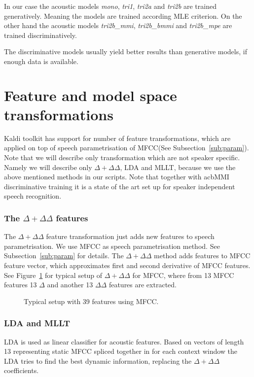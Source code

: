 In our case the acoustic models {\it mono}, {\it tri1}, {\it tri2a}\/
and {\it tri2b}\/ are trained generatively.
Meaning the models are trained according \ac{MLE} criterion.
On the other hand the acoustic models {\it tri2b\_mmi}, {\it tri2b\_bmmi}\/
and {\it tri2b\_mpe}\/ are trained discriminatively.

The discriminative models usually yield better results than generative models, 
if enough data is available. 



\section{Feature and model space transformations}
\label{sec:transform}

Kaldi toolkit has support for number of feature transformations, which are applied on top
of speech parametrisation of \ac{MFCC}(See Subsection~\ref{sub:param}).
Note that we will describe only transformation which are not speaker specific.
Namely we will describe only $\Delta + \Delta\Delta$, \ac{LDA} and \ac{MLLT},
because we use the above mentioned methods in our scripts.
Note that together with ac{bMMI} discriminative training it is
a state of the art set up for speaker independent speech recognition\cite{morbini2013asr}.

\subsubsection*{The $\Delta+\Delta\Delta$ features}
The $\Delta + \Delta\Delta$ feature transformation 
just adds new features to speech parametrisation.
We use \ac{MFCC} as speech parametrisation method. See Subsection~\ref{sub:param} for details.
The $\Delta + \Delta\Delta$ method adds features to \ac{MFCC} feature vector, which approximates 
first and second derivative of \ac{MFCC} features.
See Figure~\ref{fig:delta} for typical setup of $\Delta + \Delta\Delta$ for \ac{MFCC},
where from 13 \ac{MFCC} features 13 $\Delta$ and another 13 $\Delta\Delta$ features are extracted.

\begin{figure}
    \begin{center}
    
    \caption{Typical setup with 39 features using \ac{MFCC}.}
    \label{fig:delta} 
    \end{center}
\end{figure}


\subsubsection*{\acl{LDA} and \ac{MLLT}}
\ac{LDA} is used as linear classifier for acoustic features.
Based on vectors of length 13 representing static \ac{MFCC} 
spliced together in for each context window the \ac{LDA} tries to 
find the best dynamic information, replacing the $\Delta+\Delta\Delta$ coefficients.

